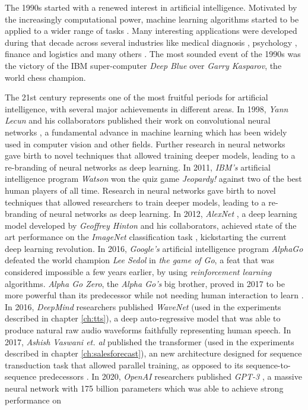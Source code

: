 The 1990s started with a renewed interest in artificial intelligence. Motivated by the increasingly computational power, machine learning algorithms started to be applied to a wider range of tasks \autocite{Tesauro:1995}. Many interesting applications were developed during that decade across several industries like medical diagnosis \autocite{declaris1991, Klein1991, punch1992, Cinar1999}, psychology \autocite{Dorrer1995, denby1999, Ogawa1999, Perlovsky1999}, finance and logistics \autocite{Lipshutz1991, Benaroch1991, Johnson1991, Falas1994} and many others \autocite{Smithers1993, Yoo1994, Mashaly1994, Koyma1998}. The most sounded event of the 1990s was the victory of the IBM super-computer \textit{Deep Blue} \autocite{Campbell2002} over \textit{Garry Kasparov}, the world chess champion.

The 21st century represents one of the most fruitful periods for artificial intelligence, with several major achievements in different areas. In 1998, \textit{Yann Lecun} and his collaborators published their work on convolutional neural networks \autocite{lecun1999}, a fundamental advance in machine learning which has been widely used in computer vision and other fields. Further research in neural networks \autocite{hinton2006, hinton2012} gave birth to novel techniques that allowed training deeper models, leading to a re-branding of neural networks as deep learning. In 2011, \textit{IBM's} artificial intelligence program \textit{Watson} won the quiz game \textit{Jeopardy!} against two of the best human players of all time. Research in neural networks gave birth to novel techniques that allowed researchers to train deeper models, leading to a re-branding of neural networks as deep learning. In 2012, \textit{AlexNet} \autocite{krizhevsky2012}, a deep learning model developed by \textit{Geoffrey Hinton} and his collaborators, achieved state of the art performance on the \textit{ImageNet} classification task \autocite{ILSVRC15}, kickstarting the current deep learning revolution. In 2016, \textit{Google's} artificial intelligence program \textit{AlphaGo} \autocite{silver2016} defeated the world champion \textit{Lee Sedol} in \textit{the game of Go}, a feat that was considered impossible a few years earlier, by using \textit{reinforcement learning} algorithms. \textit{Alpha Go Zero}, the \textit{Alpha Go's} big brother, proved in 2017 to be more powerful than its predecessor while not needing human interaction to learn \autocite{Silver2017a, Silver2017b}. In 2016, \textit{DeepMind} researchers published \textit{WaveNet} \autocite{vanderoord2016} (used in the experiments described in chapter \ref{ch:tts}), a deep auto-regressive model that was able to produce natural raw audio waveforms faithfully representing human speech. In 2017, \textit{Ashish Vaswani et. al} published the transformer \autocite{vaswani2017} (used in the experiments described in chapter \ref{ch:salesforecast}), an new architecture designed for sequence transduction task that allowed parallel training, as opposed to its sequence-to-sequence predecessors \autocite{sutskever2014}. In 2020, \textit{OpenAI} researchers published \textit{GPT-3} \autocite{brown2020}, a massive neural network with 175 billion parameters which was able to achieve strong performance on 
